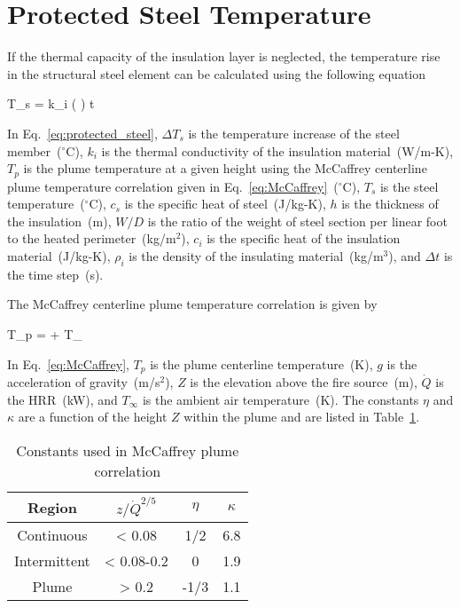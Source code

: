 \section{Protected Steel Temperature}
\label{info:protected_steel_temperature}

If the thermal capacity of the insulation layer is neglected, the temperature rise in the structural steel element can be calculated using the following equation

\be
\Delta T_s = k_i \left(  \right) \Delta t
\label{eq:protected_steel}
\ee

In Eq.~\ref{eq:protected_steel}, $\Delta T_s$ is the temperature increase of the steel member~($^\circ$C), $k_i$ is the thermal conductivity of the insulation material~(W/m-K), $T_p$ is the plume temperature at a given height using the McCaffrey centerline plume temperature correlation given in Eq.~\ref{eq:McCaffrey}~($^\circ$C), $T_s$ is the steel temperature~($^\circ$C), $c_s$ is the specific heat of steel~(J/kg-K), $h$ is the thickness of the insulation~(m), $W/D$ is the ratio of the weight of steel section per linear foot to the heated perimeter~(kg/m$^2$), $c_i$ is the specific heat of the insulation material~(J/kg-K), $\rho_i$ is the density of the insulating material~(kg/m$^3$), and $\Delta t$ is the time step~(s).

The McCaffrey centerline plume temperature correlation is given by

\be
T_p =  + T_\infty
\label{eq:McCaffrey}
\ee

In Eq.~\ref{eq:McCaffrey}, $T_p$ is the plume centerline temperature~(K), $g$ is the acceleration of gravity~(m/s$^2$), $Z$ is the elevation above the fire source~(m), $\dot Q$ is the HRR~(kW), and $T_\infty$ is the ambient air temperature~(K). The constants $\eta$ and $\kappa$ are a function of the height $Z$ within the plume and are listed in Table~\ref{tbl:McCaffrey_constants}.

\vspace{\baselineskip}
\begin{table}[ht]
\begin{center}
\caption{Constants used in McCaffrey plume correlation}
\label{tbl:McCaffrey_constants}
\begin{tabular}{|c|c|c|c|}
\hline
Region & $z/\dot Q^{2/5}$      & $\eta$ & $\kappa$ \\
\hline
Continuous & < 0.08       & 1/2  & 6.8 \\
Intermittent & < 0.08-0.2 & 0     & 1.9 \\
Plume         & > 0.2         & -1/3 & 1.1 \\
\hline
\end{tabular}
\end{center}
\end{table}

